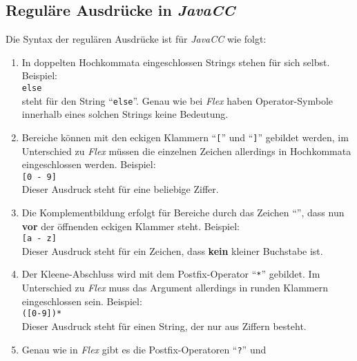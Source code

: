 \subsection{Regul\"are Ausdr\"ucke in \textsl{JavaCC}}
Die Syntax der regul\"aren Ausdr\"ucke ist f\"ur \textsl{JavaCC}\/ wie folgt:
\begin{enumerate}
\item In doppelten Hochkommata eingeschlossen Strings stehen f\"ur sich selbst.
      Beispiel:
      \\[0.2cm]
      \hspace*{1.3cm}
      \texttt{else}
      \\[0.2cm]
      steht f\"ur den String ``\texttt{else}''.  Genau wie bei \textsl{Flex}\/ haben
      Operator-Symbole innerhalb eines solchen Strings keine Bedeutung. 
\item Bereiche k\"onnen mit den eckigen Klammern ``\texttt{[}'' und ``\texttt{]}''
      gebildet werden, im Unterschied zu \textsl{Flex}\/ m\"ussen die einzelnen Zeichen
      allerdings in Hochkommata eingeschlossen werden.  Beispiel:
      \\[0.2cm]
      \hspace*{1.3cm}
      \texttt{[0 - 9]}
      \\[0.2cm]
      Dieser Ausdruck steht f\"ur eine beliebige Ziffer.
\item Die Komplementbildung erfolgt f\"ur Bereiche durch das Zeichen
      ``\texttt{}'', dass nun \textbf{vor} der \"offnenden eckigen Klammer
      steht.
      Beispiel:
      \\[0.2cm]
      \hspace*{1.3cm}
      \texttt{[a - z]}
      \\[0.2cm]
      Dieser Ausdruck steht f\"ur ein Zeichen, dass \textbf{kein} kleiner Buchstabe ist.
\item Der Kleene-Abschluss wird mit dem Postfix-Operator ``\texttt{*}'' gebildet.
      Im Unterschied zu \textsl{Flex}\/ muss das Argument allerdings in runden Klammern
      eingeschlossen sein.  Beispiel:
      \\[0.2cm]
      \hspace*{1.3cm}
      \texttt{([0-9])*}
      \\[0.2cm]
      Dieser Ausdruck steht f\"ur einen String, der nur aus Ziffern besteht.
\item Genau wie in \textsl{Flex}\/ gibt es die Postfix-Operatoren ``\texttt{?}'' und

\end{enumerate}

